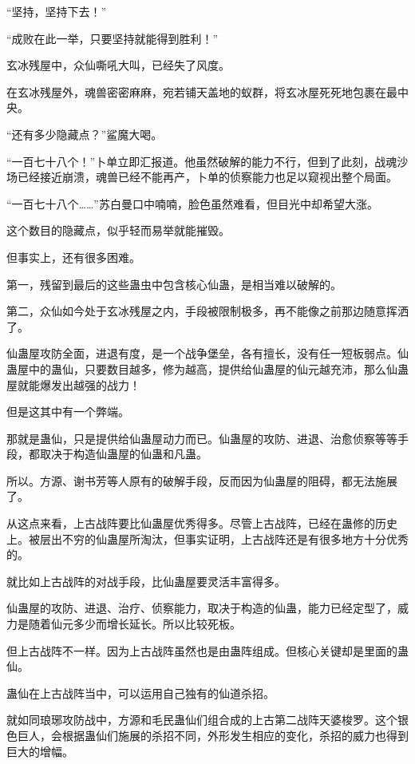 
\begin{this_body}

“坚持，坚持下去！”

“成败在此一举，只要坚持就能得到胜利！”

玄冰残屋中，众仙嘶吼大叫，已经失了风度。

在玄冰残屋外，魂兽密密麻麻，宛若铺天盖地的蚁群，将玄冰屋死死地包裹在最中央。

“还有多少隐藏点？”鲨魔大喝。

“一百七十八个！”卜单立即汇报道。他虽然破解的能力不行，但到了此刻，战魂沙场已经接近崩溃，魂兽已经不能再产，卜单的侦察能力也足以窥视出整个局面。

“一百七十八个……”苏白曼口中喃喃，脸色虽然难看，但目光中却希望大涨。

这个数目的隐藏点，似乎轻而易举就能摧毁。

但事实上，还有很多困难。

第一，残留到最后的这些蛊虫中包含核心仙蛊，是相当难以破解的。

第二，众仙如今处于玄冰残屋之内，手段被限制极多，再不能像之前那边随意挥洒了。

仙蛊屋攻防全面，进退有度，是一个战争堡垒，各有擅长，没有任一短板弱点。仙蛊屋中的蛊仙，只要数目越多，修为越高，提供给仙蛊屋的仙元越充沛，那么仙蛊屋就能爆发出越强的战力！

但是这其中有一个弊端。

那就是蛊仙，只是提供给仙蛊屋动力而已。仙蛊屋的攻防、进退、治愈侦察等等手段，都取决于构造仙蛊屋的仙蛊和凡蛊。

所以。方源、谢书芳等人原有的破解手段，反而因为仙蛊屋的阻碍，都无法施展了。

从这点来看，上古战阵要比仙蛊屋优秀得多。尽管上古战阵，已经在蛊修的历史上。被层出不穷的仙蛊屋所淘汰，但事实证明，上古战阵还是有很多地方十分优秀的。

就比如上古战阵的对战手段，比仙蛊屋要灵活丰富得多。

仙蛊屋的攻防、进退、治疗、侦察能力，取决于构造的仙蛊，能力已经定型了，威力是随着仙元多少而增长延长。所以比较死板。

但上古战阵不一样。因为上古战阵虽然也是由蛊阵组成。但核心关键却是里面的蛊仙。

蛊仙在上古战阵当中，可以运用自己独有的仙道杀招。

就如同琅琊攻防战中，方源和毛民蛊仙们组合成的上古第二战阵天婆梭罗。这个银色巨人，会根据蛊仙们施展的杀招不同，外形发生相应的变化，杀招的威力也得到巨大的增幅。


\end{this_body}
